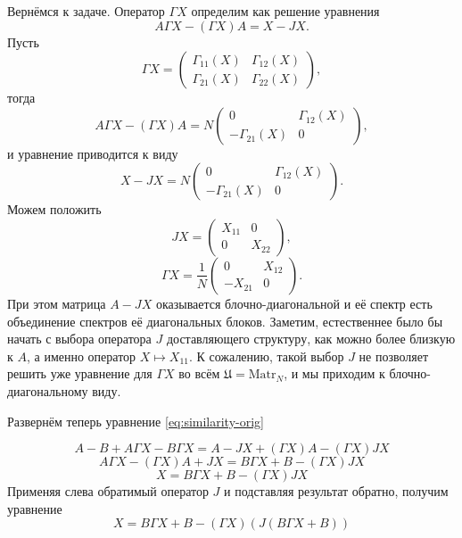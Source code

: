 Вернёмся к задаче.
Оператор \( \Gamma X \) определим как решение уравнения\footnotemark
\[
    A\Gamma X - (\Gamma X) A = X - JX.
    \]%
%
Пусть
\[ \Gamma X =
\begin{pmatrix}
    \Gamma_{11}(X) & \Gamma_{12}(X) \\
    \Gamma_{21}(X) & \Gamma_{22}(X)
\end{pmatrix}, \]
тогда
\[
    A \Gamma X - (\Gamma X) A =
    N
    \begin{pmatrix}
        0               & \Gamma_{12}(X) \\
        -\Gamma_{21}(X) & 0
    \end{pmatrix},
\]
и уравнение приводится к виду
\[
    X - JX =
    N
    \begin{pmatrix}
        0               & \Gamma_{12}(X) \\
        -\Gamma_{21}(X) & 0
    \end{pmatrix}.
\]
Можем положить
\[
    JX = \begin{pmatrix}
        X_{11} & 0 \\
        0      & X_{22}
    \end{pmatrix},
    \]
\[ \Gamma X =
\frac1N
    \begin{pmatrix}
        0       & X_{12} \\
        -X_{21} & 0
    \end{pmatrix}.
    \]
При этом матрица \( A - JX \) оказывается блочно-диагональной
и её спектр есть объединение спектров её диагональных блоков.
Заметим, естественнее было бы начать с выбора оператора \( J \) доставляющего структуру,
как можно более близкую к \( A \), а именно
оператор \( X\mapsto X_{11} \).
К сожалению, такой выбор \( J \) не позволяет решить
уже уравнение для \(\Gamma X\) во всём \(\mathfrak U = \mathrm{Matr}_{N}\),
и мы приходим к блочно-диагональному виду.

Развернём теперь уравнение \eqref{eq:similarity-orig}

\[
    A - B + A\Gamma X - B\Gamma X = A - JX + (\Gamma X) A - (\Gamma X) JX
    \]
\[
    A\Gamma X - (\Gamma X) A + JX = B \Gamma X + B - (\Gamma X) JX
    \]
\[
    X = B \Gamma X + B - (\Gamma X) JX
    \]
Применяя слева обратимый оператор \( J \) и подставляя результат обратно, получим уравнение
\begin{equation}\label{eq:similarity2}
    X = B \Gamma X + B - (\Gamma X) (J(B\Gamma X + B))
\end{equation}


